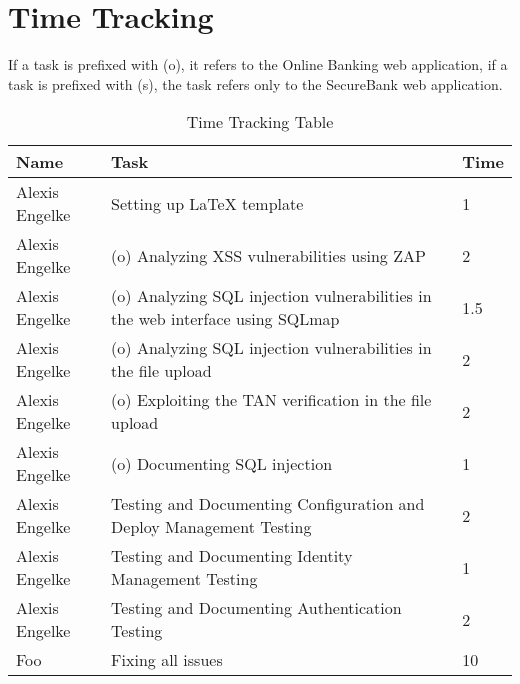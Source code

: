 \chapter{Time Tracking}\label{chapter:times}

If a task is prefixed with (o), it refers to the Online Banking web application, if a task is prefixed with (s), the task refers only to the SecureBank web application.

\begin{table}[htpb]
  \caption[Time Tracking Table]{Time Tracking Table}\label{tab:times}
  \centering
  \begin{tabular}{l p{8cm} l}
    \toprule
      Name & Task & Time \\
    \midrule
      Alexis Engelke & Setting up LaTeX template & 1 \\
      Alexis Engelke & (o) Analyzing XSS vulnerabilities using ZAP & 2 \\
      Alexis Engelke & (o) Analyzing SQL injection vulnerabilities in the web interface using SQLmap & 1.5 \\
      Alexis Engelke & (o) Analyzing SQL injection vulnerabilities in the file upload & 2 \\
      Alexis Engelke & (o) Exploiting the TAN verification in the file upload & 2 \\
      Alexis Engelke & (o) Documenting SQL injection & 1 \\
      Alexis Engelke & Testing and Documenting Configuration and Deploy Management Testing & 2 \\
      Alexis Engelke & Testing and Documenting Identity Management Testing & 1 \\
      Alexis Engelke & Testing and Documenting Authentication Testing & 2 \\
      Foo & Fixing all issues & 10 \\
    \bottomrule
  \end{tabular}
\end{table}
